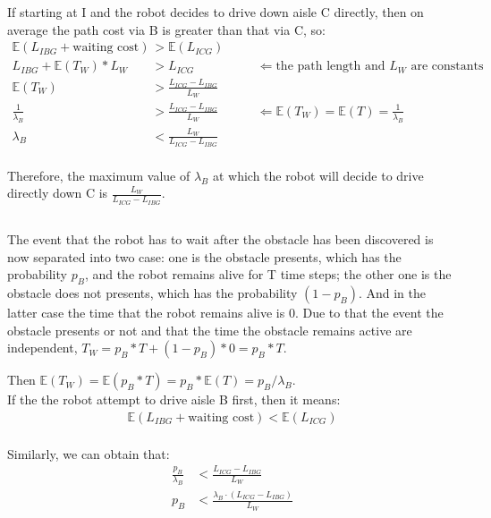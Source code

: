 \documentclass{article}
\begin{document}
If starting at I and the robot decides to drive down aisle C directly, then on average the path cost via B is greater than that via C, so:
\begin{align*}
\mathbb{E}(L_{IBG} + \text{waiting cost}) &> \mathbb{E}(L_{ICG})	\\
L_{IBG} + \mathbb{E}(T_{W}) * L_{W} &> L_{ICG} 	&\quad	&\Leftarrow \text{the path length and $L_{W}$ are constants}	\\
\mathbb{E}(T_{W}) &> \frac{L_{ICG} - L_{IBG} } {L_{W}}	\\
\frac{1}{\lambda_{B}} &> \frac{L_{ICG} - L_{IBG} } {L_{W}}	&\quad	&\Leftarrow  \mathbb{E}(T_{W}) = \mathbb{E}(T) = \frac{1}{\lambda_{B}} \\
\lambda_{B} &< \frac {L_{W}} {L_{ICG} - L_{IBG} } 	\\
\end{align*}

Therefore, the maximum value of $\lambda_{B}$ at which the robot will decide to drive directly down C is $\frac {L_{W}} {L_{ICG} - L_{IBG} } $.

\subsection{}
The event that the robot has to wait after the obstacle has been discovered is now separated into two case: one is the obstacle presents, which has the probability $p_{B}$, and the robot remains alive for T time steps; the other one is the obstacle does not presents, which has the probability $(1-p_{B})$. And in the latter case the time that the robot remains alive is 0. Due to that the event the obstacle presents or not and that the time the obstacle remains active are independent, $T_{W} = p_{B}*T + (1-p_{B}) * 0 = p_{B}*T $.

Then $\mathbb{E}(T_{W}) = \mathbb{E}(p_{B}*T) =p_{B} * \mathbb{E}(T)  = p_{B} / \lambda_{B}$. \\


If the the robot attempt to drive aisle B first, then it means:
\begin{align*}
\mathbb{E}(L_{IBG} + \text{waiting cost}) < \mathbb{E}(L_{ICG})	\\
\end{align*}

Similarly, we can obtain that:
\begin{align*}
\frac{p_{B}}{\lambda_{B}} &< \frac{L_{ICG} - L_{IBG} } {L_{W}}	\\
p_{B} &< \frac{\lambda_{B}  \cdot (L_{ICG} - L_{IBG})}{L_{W}}
\end{align*}
\end{document}
